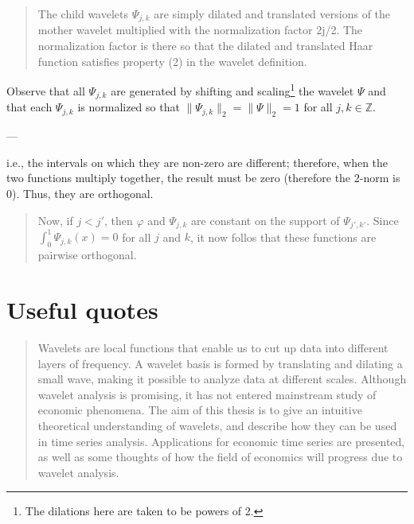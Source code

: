 \documentclass[11pt]{amsart}
\theoremstyle{theorem} %
\theoremstyle{definition}
\theoremstyle{example}
\theoremstyle{remark}
\numberwithin{equation}{section}
\newcommand{\Z}{\mathbb{Z}}
\begin{document}
\begin{quote}
	The child wavelets $ \varPsi_{j,k} $ are simply dilated and translated versions of the mother wavelet multiplied with the normalization factor 2j/2. The normalization factor is there so that the dilated and translated Haar function satisfies property (2) in the wavelet	definition.
\end{quote}

Observe that all $ \varPsi_{j,k} $ are generated by shifting and scaling\footnote{The dilations here are taken to be powers of 2.} the wavelet $ \varPsi $ and that each $ \varPsi_{j,k} $ is normalized so that $ \| \varPsi_{j,k}\|_2 = \|\varPsi\|_2 = 1 $ for all $ j,k \in \Z $.

---

i.e., the intervals on which they are non-zero are different; therefore, when the two functions multiply together, the result must be zero (therefore the 2-norm is 0). Thus, they are orthogonal. 
\begin{quote}
	Now, if $ j < j' $, then $ \varphi $ and $ \varPsi_{j,k} $ are constant on the support of $ \varPsi_{j',k'} $. Since $ \int_0^1 \varPsi_{j,k}(x) = 0 $ for all $ j $ and $ k $, it now follos that these functions are pairwise orthogonal.
\end{quote}

\section{Useful quotes}
\begin{quote}
	Wavelets are local functions that enable us to cut up data into different layers of frequency. A wavelet basis is formed by translating and dilating a small wave, making it
	possible to analyze data at different scales. Although wavelet analysis is promising, it
	has not entered mainstream study of economic phenomena. The aim of this thesis is to
	give an intuitive theoretical understanding of wavelets, and describe how they can be
	used in time series analysis. Applications for economic time series are presented, as well
	as some thoughts of how the field of economics will progress due to wavelet analysis.
\end{quote}
\end{document}
